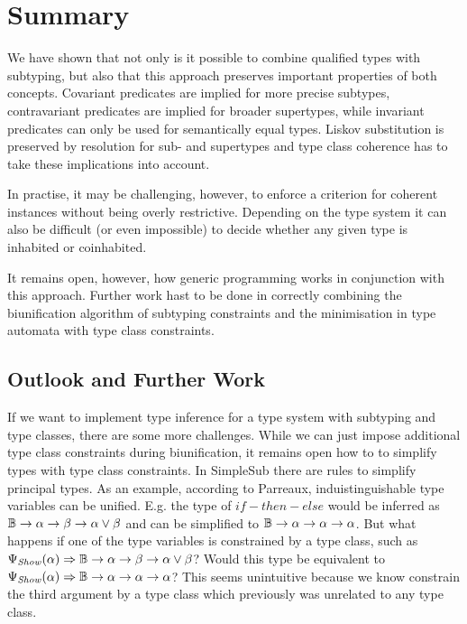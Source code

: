 
\chapter{Summary}
\label{ch:summary}

We have shown that not only is it possible to combine qualified types with subtyping, but also that this approach preserves important properties of both concepts.
Covariant predicates are implied for more precise subtypes, contravariant predicates are implied for broader supertypes, while invariant predicates can only be used for semantically equal types.
Liskov substitution is preserved by resolution for sub- and supertypes and type class coherence has to take these implications into account.

In practise, it may be challenging, however, to enforce a criterion for coherent instances without being overly restrictive.
Depending on the type system it can also be difficult (or even impossible) to decide whether any given type is inhabited or coinhabited.

It remains open, however, how generic programming works in conjunction with this approach.
Further work hast to be done in correctly combining the biunification algorithm of subtyping constraints and the minimisation in type automata with type class constraints.


\section{Outlook and Further Work}

If we want to implement type inference for a type system with subtyping and type classes, there are some more challenges.
While we can just impose additional type class constraints during biunification, it remains open how to to simplify types with type class constraints.
In SimpleSub \cite{10.1145/3409006} there are rules to simplify principal types.
As an example, according to Parreaux, induistinguishable type variables can be unified.
E.g. the type of $\mathit{if-then-else}$ would be inferred as $\mathbb{B} \to \alpha \to \beta \to \alpha \vee \beta$ and can be simplified to $\mathbb{B} \to \alpha \to \alpha \to \alpha$.
But what happens if one of the type variables is constrained by a type class, such as $\Psi_\mathit{Show}(\alpha) \Rightarrow \mathbb{B} \to \alpha \to \beta \to \alpha \vee \beta$?
Would this type be equivalent to $\Psi_\mathit{Show}(\alpha) \Rightarrow \mathbb{B} \to \alpha \to \alpha \to \alpha$?
This seems unintuitive because we know constrain the third argument by a type class which previously was unrelated to any type class.

\clearpage
